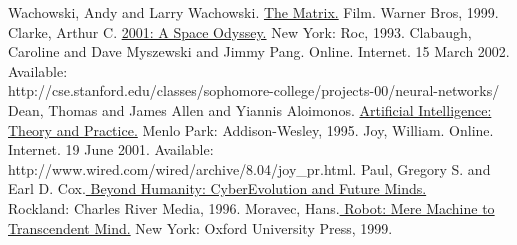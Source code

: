 \documentclass[a4paper,12pt,oneside]{report}
\begin{document}
\newpage
\preface




\body







%
%

\begin{thebibliography}{10}
 Wachowski, Andy and Larry Wachowski. \underline{The Matrix.} Film. Warner Bros, 1999.
 Clarke, Arthur C. \underline{2001: A Space Odyssey.} New York: Roc, 1993.
 Clabaugh, Caroline and Dave Myszewski and Jimmy Pang. 
Online. Internet. 15 March 2002. Available:\\
http://cse.stanford.edu/classes/sophomore-college/projects-00/neural-networks/
 Dean, Thomas and James Allen and Yiannis Aloimonos. \underline{Artificial Intelligence:
Theory and Practice.} Menlo Park: Addison-Wesley, 1995.
 Joy, William.  Online. Internet. 19 June
2001. Available: http://www.wired.com/wired/archive/8.04/joy\_pr.html.
 Paul, Gregory S. and Earl D. Cox.\underline{ Beyond Humanity: CyberEvolution and Future
Minds. } \\ Rockland: Charles River Media, 1996.
 Moravec, Hans.\underline{ Robot: Mere Machine to Transcendent Mind.} New York: Oxford
University Press, 1999.
\end{thebibliography}


%
\end{document}
